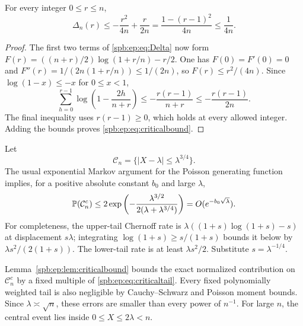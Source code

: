 \begin{lemma}\label{spb:ep:lem:criticalbound}
For every integer $0\le r\le n$,
\begin{equation}\label{spb:ep:eq:criticalbound}
 \Delta_n(r)\le-\frac{r^2}{4n}+\frac r{2n}
              =\frac{1-(r-1)^2}{4n}\le\frac1{4n}.
\end{equation}
\end{lemma}
\begin{proof}
The first two terms of \eqref{spb:ep:eq:Delta} now form
$F(r)=((n+r)/2)\log(1+r/n)-r/2$.
One has $F(0)=F'(0)=0$ and
$F''(r)=1/(2n(1+r/n))\le1/(2n)$, so $F(r)\le r^2/(4n)$.
Since $\log(1-x)\le-x$ for $0\le x<1$,
\[
 \sum_{h=0}^{r-1}\log\left(1-\frac{2h}{n+r}\right)
       \le-\frac{r(r-1)}{n+r}\le-\frac{r(r-1)}{2n}.
\]
The final inequality uses $r(r-1)\ge0$, which holds at every allowed
integer. Adding the bounds proves \eqref{spb:ep:eq:criticalbound}.
\end{proof}

Let
\begin{equation}\label{spb:ep:eq:criticalbulk}
 \mathcal C_n=\{|X-\lambda|\le\lambda^{3/4}\}.
\end{equation}
The usual exponential Markov argument for the Poisson generating function
implies, for a positive absolute constant $b_0$ and large $\lambda$,
\begin{equation}\label{spb:ep:eq:criticaltail}
 \mathbb P(\mathcal C_n^c)
 \le2\exp\left(-\frac{\lambda^{3/2}}
                         {2(\lambda+\lambda^{3/4})}\right)
 =O(e^{-b_0\sqrt\lambda}).
\end{equation}
For completeness, the upper-tail Chernoff rate is
$\lambda((1+s)\log(1+s)-s)$ at displacement $s\lambda$;
integrating $\log(1+s)\ge s/(1+s)$ bounds it below by
$\lambda s^2/(2(1+s))$. The lower-tail rate is at least
$\lambda s^2/2$. Substitute $s=\lambda^{-1/4}$.

Lemma~\ref{spb:ep:lem:criticalbound} bounds the exact normalized contribution
on $\mathcal C_n^c$ by a fixed multiple of \eqref{spb:ep:eq:criticaltail}.
Every fixed polynomially weighted tail is also negligible by
Cauchy--Schwarz and Poisson moment bounds. Since $\lambda\asymp\sqrt n$,
these errors are smaller than every power of $n^{-1}$.
For large $n$, the central event lies inside $0\le X\le2\lambda<n$.

